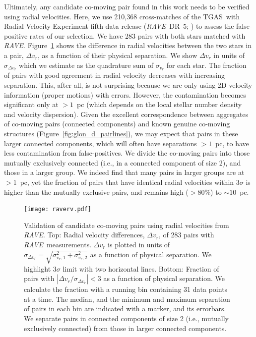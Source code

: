 \documentclass[manuscript, letterpaper]{aastex6}
\newcommand{\project}[1]{\textsl{#1}}
\newcommand{\acronym}[1]{{\small{#1}}}
\newcommand{\rave}{\project{\acronym{RAVE}}}
\newcommand{\tgas}{\acronym{TGAS}}
\begin{document}
Ultimately, any candidate co-moving pair found in this work
needs to be verified using radial velocities.
Here, we use 210,368 cross-matches of the \tgas\ with
Radial Velocity Experiment fifth data release (\rave\ DR~5; \citealt{2016arXiv160903210K}) to
assess the false-positive rates of our selection.
We have 283 pairs with both stars matched with \rave.
Figure~\ref{fig:raverv} shows the difference in radial velocities
between the two stars in a pair, $\Delta v_r$, as a function of their physical separation.
We show $\Delta v_r$ in units of $\sigma_{\Delta v_r}$ which we estimate
as the quadrature sum of $\sigma _{v_r}$ for each star.
The fraction of pairs with good agreement in radial velocity decreases with
increasing separation.
This, after all, is not surprising because we are only using
2D velocity information (proper motions) with errors.
However, the contamination becomes significant only at $>1$~pc
(which depends on the local stellar number density and velocity dispersion).
Given the excellent correspondence between
aggregates of co-moving pairs (connected components)
and known genuine co-moving structures (Figure~\ref{fig:glon_d_pairlines}),
we may expect that pairs in these larger connected components,
which will often have separations $>1$~pc,
to have less contamination from false-positives.
We divide the co-moving pairs into those
mutually exclusively connected (i.e., in a connected component of
size 2), and those in a larger group.
We indeed find that many pairs in larger groups are at $>1$~pc, yet
the fraction of pairs that have identical radial velocities within $3\sigma$ is
higher than the mutually exclusive pairs, and remains high ($>80\%$) to $\sim 10$~pc.

\begin{figure}[htbp]
  \begin{center}
    \texttt{[image: raverv.pdf]}
  \end{center}
  \caption{%
    Validation of candidate co-moving pairs using radial velocities from \rave.
    Top: Radial velocity differences, $\Delta v_r$, of 283 pairs with \rave\ measurements.
    $\Delta v_r$ is plotted in units of $\sigma_{\Delta v_r} = \sqrt{\sigma_{v_r,1}^2 + \sigma_{v_r,2}^2}$
    as a function of physical separation.
    We highlight $3\sigma$ limit with two horizontal lines.
    Bottom: Fraction of pairs with $|\Delta v_r/\sigma_{\Delta v_r}| <3$
    as a function of physical separation. We calculate the fraction with a running
    bin containing 31 data points at a time.
    The median, and the minimum and maximum separation of pairs in each bin are
    indicated with a marker, and its errorbars.
    We separate pairs in connected components of size 2 (i.e., mutually exclusively connected)
    from those in larger connected components.
    \label{fig:raverv}}
\end{figure}
\end{document}
